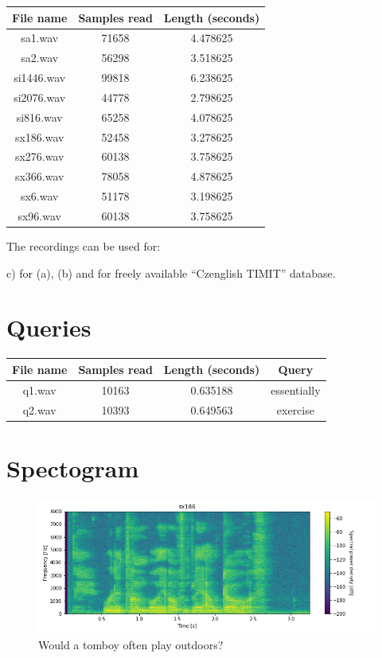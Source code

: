 \documentclass[11pt]{article}
\begin{document}
\begin{center}
\begin{tabular}{ |c|c|c| } 
 \hline
 File name & Samples read & Length (seconds) \\ 
 \hline
 sa1.wav &  71658 & 4.478625 \\ 
 sa2.wav & 56298 & 3.518625 \\ 
 si1446.wav & 99818 & 6.238625 \\ 
 si2076.wav & 44778 & 2.798625 \\ 
 si816.wav & 65258 & 4.078625 \\ 
 sx186.wav & 52458 & 3.278625 \\ 
 sx276.wav & 60138 & 3.758625 \\ 
 sx366.wav & 78058 & 4.878625 \\ 
 sx6.wav & 51178 &  3.198625 \\ 
 sx96.wav & 60138 & 3.758625 \\ 
 \hline
\end{tabular}
\end{center}
\par 
The recordings can be used for: 
\par
c) for (a), (b) and for freely available “Czenglish TIMIT” database. 

\section{Queries}
\begin{center}
\begin{tabular}{ |c|c|c|c| } 
 \hline
 File name & Samples read & Length (seconds) & Query \\ 
 \hline
 q1.wav &  10163 & 0.635188 & essentially \\ 
 q2.wav & 10393 & 0.649563 & exercise \\ 
 \hline
\end{tabular}
\end{center}

\section{Spectogram}
\begin{figure}[H]
	\includegraphics[width=\linewidth]{./sx186_spectogram.png}
	\caption{Would a tomboy often play outdoors?}
\end{figure}
\end{document}
